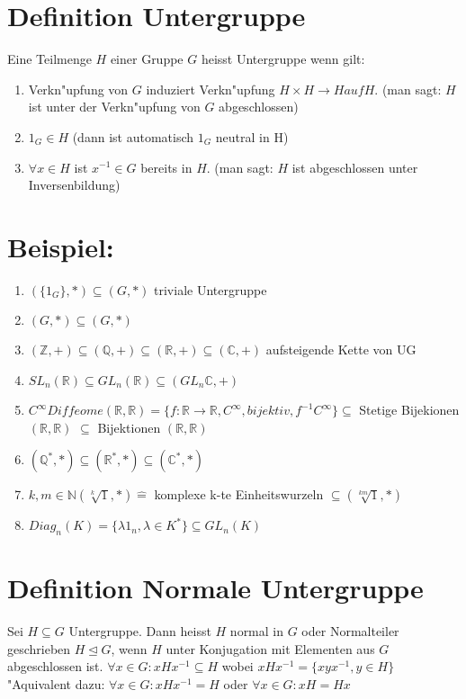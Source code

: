 \documentclass[12pt,a4paper,ngerman]{scrreprt}
\begin{document}
\section{Definition Untergruppe}

Eine Teilmenge $H$ einer Gruppe $G$ heisst Untergruppe wenn gilt:

\begin{enumerate}[({UG}1)]
\item Verkn"upfung von $G$ induziert Verkn"upfung $H \times H \to H auf H$. (man sagt: $H$ ist unter der Verkn"upfung von $G$ abgeschlossen)
\item $1_G \in H $ (dann ist automatisch $1_G$ neutral in H)
\item $\forall x \in H$ ist $x^{-1} \in G $ bereits in $H$. (man sagt: $H$ ist abgeschlossen unter Inversenbildung)
\end{enumerate}

\section{Beispiel:}
\begin{enumerate}[(1)]
\item $(\{1_G\}, *) \subseteq (G, *)$ triviale Untergruppe
\item $(G, *) \subseteq (G,*)$ %
\item $(\mathbb{Z}, +) \subseteq (\mathbb{Q}, +) \subseteq (\mathbb{R}, +) \subseteq (\mathbb{C}, +)$ aufsteigende Kette von UG
\item $SL_n(\mathbb{R}) \subseteq GL_n(\mathbb{R}) \subseteq (GL_n\mathbb{C}, +)$
\item $C^\infty Diffeome(\mathbb{R}, \mathbb{R}) = \{f: \mathbb{R} \to \mathbb{R}, C^\infty, bijektiv, f^{-1} C^\infty\} \subseteq$ Stetige Bijekionen $(\mathbb{R}, \mathbb{R})$
$\subseteq$ Bijektionen $(\mathbb{R}, \mathbb{R})$
\item $(\mathbb{Q}^* , *) \subseteq (\mathbb{R}^*, *) \subseteq (\mathbb{C}^*, *)$
\item $k,m \in \mathbb{N} (\sqrt[k]{1}, *) \mathrel{\widehat{=}}$ komplexe k-te Einheitswurzeln $ \subseteq (\sqrt[km]{1},*)$
\item $Diag_n(K) = \{\lambda 1_n , \lambda \in K^*\} \subseteq GL_n(K)$
\end{enumerate}

\section{Definition Normale Untergruppe}
Sei $H\subseteq G$ Untergruppe. Dann heisst $H$ normal in $G$ oder Normalteiler geschrieben $H \trianglelefteq G$, wenn $H$ unter Konjugation mit Elementen aus $G$ abgeschlossen ist.
$\forall x \in G : xHx^{-1} \subseteq H$ wobei $xHx^{-1} = \{xyx^{-1}, y \in H\}$ "Aquivalent dazu: $\forall x \in G: xHx^{-1} = H$ oder
$\forall x \in G : xH = Hx$
\end{document}
